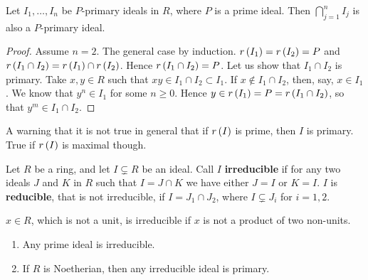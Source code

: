 \begin{lemma}
\label{lem:11.4}
Let $ I_1, \dots, I_n $ be $ P $-primary ideals in $ R $, where $ P $ is a prime ideal. Then $ \bigcap_{j = 1}^n I_j $ is also a $ P $-primary ideal.
\end{lemma}

\begin{proof}
Assume $ n = 2 $. The general case by induction. $ r\br{I_1} = r\br{I_2} = P $ and $ r\br{I_1 \cap I_2} = r\br{I_1} \cap r\br{I_2} $. Hence $ r\br{I_1 \cap I_2} = P $. Let us show that $ I_1 \cap I_2 $ is primary. Take $ x, y \in R $ such that $ xy \in I_1 \cap I_2 \subset I_1 $. If $ x \notin I_1 \cap I_2 $, then, say, $ x \in I_1 $. We know that $ y^n \in I_1 $ for some $ n \ge 0 $. Hence $ y \in r\br{I_1} = P = r\br{I_1 \cap I_2} $, so that $ y^m \in I_1 \cap I_2 $.
\end{proof}

A warning that it is not true in general that if $ r\br{I} $ is prime, then $ I $ is primary. True if $ r\br{I} $ is maximal though.

\pagebreak


\begin{definition}
Let $ R $ be a ring, and let $ I \subsetneq R $ be an ideal. Call $ I $ \textbf{irreducible} if for any two ideals $ J $ and $ K $ in $ R $ such that $ I = J \cap K $ we have either $ J = I $ or $ K = I $. $ I $ is \textbf{reducible}, that is not irreducible, if $ I = J_1 \cap J_2 $, where $ I \subsetneq J_i $ for $ i = 1, 2 $.
\end{definition}

\begin{note*}
$ x \in R $, which is not a unit, is irreducible if $ x $ is not a product of two non-units.
\end{note*}

\begin{proposition}
\label{prop:11.5}
\hfill
\begin{enumerate}
\item Any prime ideal is irreducible.
\item If $ R $ is Noetherian, then any irreducible ideal is primary.
\end{enumerate}
\end{proposition}

